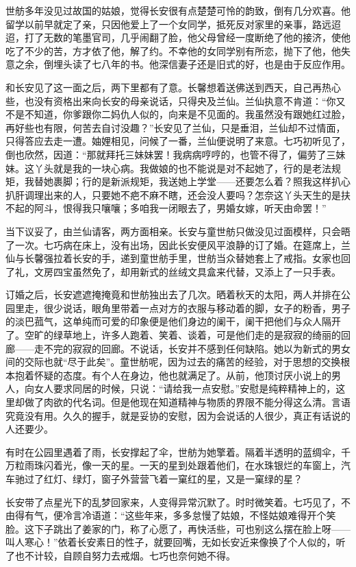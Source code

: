 \par 世舫多年没见过故国的姑娘，觉得长安很有点楚楚可怜的韵致，倒有几分欢喜。他留学以前早就定了亲，只因他爱上了一个女同学，抵死反对家里的亲事，路远迢迢，打了无数的笔墨官司，几乎闹翻了脸，他父母曾经一度断绝了他的接济，使他吃了不少的苦，方才依了他，解了约。不幸他的女同学别有所恋，抛下了他，他失意之余，倒埋头读了七八年的书。他深信妻子还是旧式的好，也是由于反应作用。
\par 和长安见了这一面之后，两下里都有了意。长馨想着送佛送到西天，自己再热心些，也没有资格出来向长安的母亲说话，只得央及兰仙。兰仙执意不肯道：“你又不是不知道，你爹跟你二妈仇人似的，向来是不见面的。我虽然没有跟她红过脸，再好些也有限，何苦去自讨没趣？”长安见了兰仙，只是垂泪，兰仙却不过情面，只得答应去走一遭。妯娌相见，问候了一番，兰仙便说明了来意。七巧初听见了，倒也欣然，因道：“那就拜托三妹妹罢！我病病哼哼的，也管不得了，偏劳了三妹妹。这丫头就是我的一块心病。我做娘的也不能说是对不起她了，行的是老法规矩，我替她裹脚；行的是新派规矩，我送她上学堂——还要怎么着？照我这样扒心扒肝调理出来的人，只要她不疤不麻不瞎，还会没人要吗？怎奈这丫头天生的是扶不起的阿斗，恨得我只嚷嚷；多咱我一闭眼去了，男婚女嫁，听天由命罢！”
\par 当下议妥了，由兰仙请客，两方面相亲。长安与童世舫只做没见过面模样，只会晤了一次。七巧病在床上，没有出场，因此长安便风平浪静的订了婚。在筵席上，兰仙与长馨强拉着长安的手，递到童世舫手里，世舫当众替她套上了戒指。女家也回了礼，文房四宝虽然免了，却用新式的丝绒文具盒来代替，又添上了一只手表。
\par 订婚之后，长安遮遮掩掩竟和世舫独出去了几次。晒着秋天的太阳，两人并排在公园里走，很少说话，眼角里带着一点对方的衣服与移动着的脚，女子的粉香，男子的淡巴菰气，这单纯而可爱的印象便是他们身边的阑干，阑干把他们与众人隔开了。空旷的绿草地上，许多人跑着、笑着、谈着，可是他们走的是寂寂的绮丽的回廊——走不完的寂寂的回廊。不说话，长安并不感到任何缺陷。她以为新式的男女间的交际也就“尽于此矣”。童世舫呢，因为过去的痛苦的经验，对于思想的交换根本抱着怀疑的态度。有个人在身边，他也就满足了。从前，他顶讨厌小说上的男人，向女人要求同居的时候，只说：“请给我一点安慰。”安慰是纯粹精神上的，这里却做了肉欲的代名词。但是他现在知道精神与物质的界限不能分得这么清。言语究竟没有用。久久的握手，就是妥协的安慰，因为会说话的人很少，真正有话说的人还要少。
\par 有时在公园里遇着了雨，长安撑起了伞，世舫为她擎着。隔着半透明的蓝绸伞，千万粒雨珠闪着光，像一天的星。一天的星到处跟着他们，在水珠银烂的车窗上，汽车驰过了红灯、绿灯，窗子外营营飞着一窠红的星，又是一窠绿的星？
\par 长安带了点星光下的乱梦回家来，人变得异常沉默了。时时微笑着。七巧见了，不由得有气，便冷言冷语道：“这些年来，多多怠慢了姑娘，不怪姑娘难得开个笑脸。这下子跳出了姜家的门，称了心愿了，再快活些，可也别这么摆在脸上呀——叫人寒心！”依着长安素日的性子，就要回嘴，无如长安近来像换了个人似的，听了也不计较，自顾自努力去戒烟。七巧也奈何她不得。
